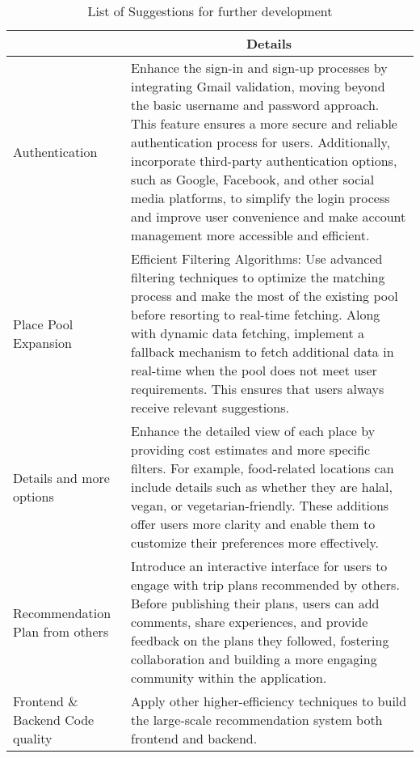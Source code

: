 \newpage
\begin{table}[]
    \centering
    \renewcommand{\arraystretch}{1.2} %
    \begin{tabular}{|p{2.2in}|p{4in}|}
    \hline
    \rowcolor[HTML]{C0C0C0} 
    \multicolumn{1}{|c|}{\cellcolor[HTML]{C0C0C0}\textbf{Suggestion}}                                                                                       & \multicolumn{1}{c|}{\cellcolor[HTML]{C0C0C0}\textbf{Details}}   \\ \hline
    Authentication & Enhance the sign-in and sign-up processes by integrating Gmail validation, moving beyond the basic username and password approach. This feature ensures a more secure and reliable authentication process for users. Additionally, incorporate third-party authentication options, such as Google, Facebook, and other social media platforms, to simplify the login process and improve user convenience and make account management more accessible and efficient. \\ \hline
    Place Pool Expansion & Efficient Filtering Algorithms: Use advanced filtering techniques to optimize the matching process and make the most of the existing pool before resorting to real-time fetching. Along with dynamic data fetching, implement a fallback mechanism to fetch additional data in real-time when the pool does not meet user requirements. This ensures that users always receive relevant suggestions. \\ \hline
    Details and more options & Enhance the detailed view of each place by providing cost estimates and more specific filters. For example, food-related locations can include details such as whether they are halal, vegan, or vegetarian-friendly. These additions offer users more clarity and enable them to customize their preferences more effectively. \\ \hline
    Recommendation Plan from others & Introduce an interactive interface for users to engage with trip plans recommended by others. Before publishing their plans, users can add comments, share experiences, and provide feedback on the plans they followed, fostering collaboration and building a more engaging community within the application. \\ \hline
    Frontend \& Backend Code quality & Apply other higher-efficiency techniques to build the large-scale recommendation system both frontend and backend. \\ \hline
    \end{tabular}
    \caption{List of Suggestions for further development}
    \label{tab:suggestion-table}
\end{table}

